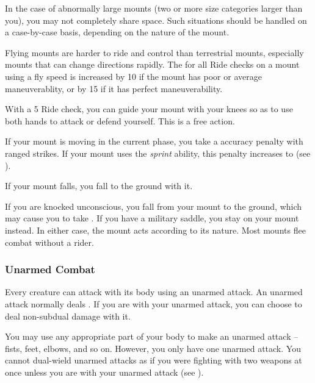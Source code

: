             In the case of abnormally large mounts (two or more size categories larger than you), you may not completely share space. Such situations should be handled on a case-by-case basis, depending on the nature of the mount.

             Flying mounts are harder to ride and control than terrestrial mounts, especially mounts that can change directions rapidly.
            The  for all Ride checks on a mount using a fly speed is increased by 10 if the mount has poor or average maneuverablity, or by 15 if it has perfect maneuverability.

             With a  5 Ride check, you can guide your mount with your knees so as to use both hands to attack or defend yourself. This is a free action.

            If your mount is moving in the current phase, you take a  accuracy penalty with ranged strikes.
            If your mount uses the \textit{sprint} ability, this penalty increases to  (see ).

             If your mount falls, you fall to the ground with it.

             If you are knocked unconscious, you fall from your mount to the ground, which may cause you to take .
            If you have a military saddle, you stay on your mount instead.
            In either case, the mount acts according to its nature.
            Most mounts flee combat without a rider.

        \subsubsection{Unarmed Combat}\label{Unarmed Combat}
            Every creature can attack with its body using an unarmed attack.
            An unarmed attack normally deals .
            If you are  with your unarmed attack, you can choose to deal non-subdual damage with it.

            You may use any appropriate part of your body to make an unarmed attack -- fists, feet, elbows, and so on.
            However, you only have one unarmed attack.
            You cannot dual-wield unarmed attacks as if you were fighting with two weapons at once unless you are  with your unarmed attack (see ).

